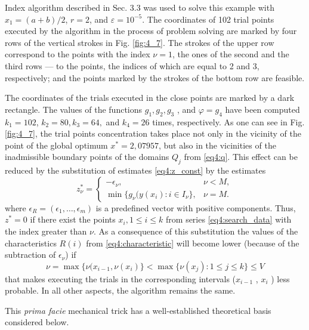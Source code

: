 Index algorithm described in Sec. 3.3 was used to solve this example with $x_1=(a+b)/2$, $r=2$, and $\varepsilon=10^{-5}$. The coordinates of 102 trial points executed by the algorithm in the process of problem solving are marked by four rows of the vertical strokes in Fig. \ref{fig:4_7}. The strokes of the upper row correspond to the points with the index $\nu=1$, the ones of the second and the third rows --- to the points, the indices of which are equal to 2 and 3, respectively; and the points
marked by the strokes of the bottom row are feasible.

The coordinates of the trials executed in the close points are marked by a dark rectangle. The values of the functions $g_1 , g_2 , g_3$ , and $\varphi=g_4$ have been computed $k_1=102$, $k_2=80, k_3=64,$ and $k_4=26$ times, respectively. As one can see in Fig. \ref{fig:4_7}, the trial points concentration takes place not only in the vicinity of the point of the global optimum $x^*=2,07957$, but also in the vicinities of the inadmissible boundary points of the domains $Q_j$ from \eqref{eq4:q}. This effect can be reduced by the substitution of estimates \eqref{eq4:z_const} by the estimates
\begin{equation}
  z_\nu^\ast = \left\{
  \begin{array}{lr}
    -\epsilon_\nu, & \nu < M,\\
    \min\{ g_\nu(y(x_i): i\in I_\nu \}, & \nu = M.
  \end{array}
  \right.
\end{equation}
where $\epsilon_R=(\epsilon_1 ,\dots, \epsilon_m)$ is a predefined vector with positive components. Thus, $z^*=0$ if there exist the points $x_i,1\le i\le k$ from series \eqref{eq4:search_data} with the index greater than $\nu$. As a consequence of this substitution the values of the characteristics $R(i)$ from \eqref{eq4:characteristic} will become lower (because of the subtraction of $\epsilon_\nu$) if
\begin{equation}
  \nu=\max\{\nu(x_{i-1},\nu(x_i)\}<\max\{\nu(x_j):1\le j\le k\}\le V
\end{equation}
that makes executing the trials in the corresponding intervals  ($x_{i-1}$ , $x_i$ ) less probable. In all other aspects, the algorithm remains the same.

This \emph{prima facie} mechanical trick has a well-established theoretical basis considered below.

